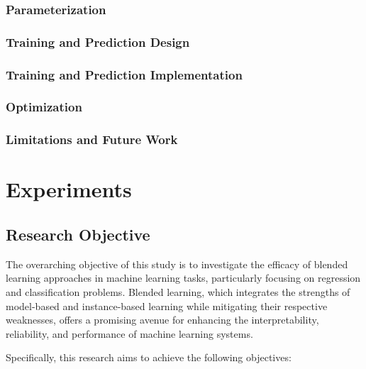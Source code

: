 \documentclass[a4paper, 12pt]{report}
\begin{document}
\subsection{Parameterization}
\subsection{Training and Prediction Design}
\subsection{Training and Prediction Implementation}
\subsection{Optimization}
\subsection{Limitations and Future Work}
\chapter{Experiments}
\label{ch:Experiments}

\section{Research Objective}

The overarching objective of this study is to investigate the efficacy of blended learning approaches in machine learning tasks, 
particularly focusing on regression and classification problems. Blended learning, which integrates the strengths of model-based and instance-based learning while mitigating their respective weaknesses, 
offers a promising avenue for enhancing the interpretability, reliability, and performance of machine learning systems.

Specifically, this research aims to achieve the following objectives:
\end{document}
